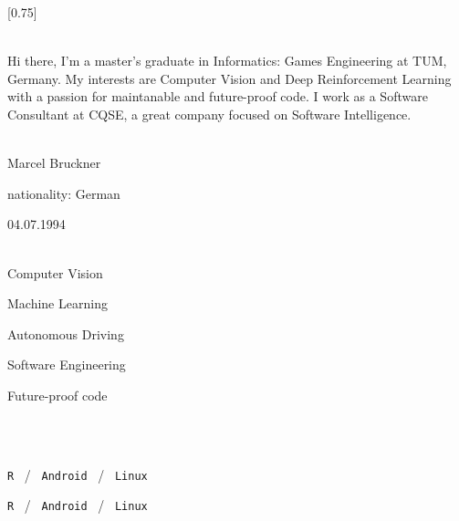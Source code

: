 \documentclass[lighthipster]{simplehipstercv}
\begin{document}
\setlength{\columnsep}{1.5cm}
[0.75]
\begin{paracol}{2}

    \paracolbackgroundoptions



    \footnotesize
    {\setasidefontcolour
    \flushright
    \begin{center}
    \end{center}

    \\[0.5em]

    {\footnotesize
    Hi there, I'm a master's graduate in Informatics: Games Engineering at TUM, Germany. My interests are Computer Vision and Deep Reinforcement Learning with a passion for maintanable and future-proof code. I work as a Software Consultant at CQSE, a great company focused on Software Intelligence.
    }
    \bigskip

     \\[0.5em]
    Marcel Bruckner

    nationality: German

    04.07.1994

    \bigskip

     \\[0.5em]
    Computer Vision

    Machine Learning

    Autonomous Driving

    Software Engineering

    Future-proof code

    \bigskip



    \bigskip

    \\[0.5em]

    \lorem
    \bigskip

    \\[0.5em]

    \texttt{R} ~/~ \texttt{Android} ~/~ \texttt{Linux}

    \texttt{R} ~/~ \texttt{Android} ~/~ \texttt{Linux}

}
\end{paracol}
\end{document}
